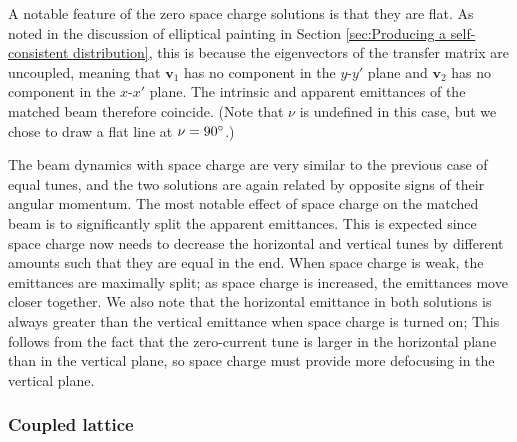 %
A notable feature of the zero space charge solutions is that they are flat. As noted in the discussion of elliptical painting in Section \ref{sec:Producing a self-consistent distribution}, this is because the eigenvectors of the transfer matrix are uncoupled, meaning that $\mathbf{v}_1$ has no component in the $y$-$y'$ plane and $\mathbf{v}_2$ has no component in the $x$-$x'$ plane. The intrinsic and apparent emittances of the matched beam therefore coincide. (Note that $\nu$ is undefined in this case, but we chose to draw a flat line at $\nu = 90\degree$.) 

The beam dynamics with space charge are very similar to the previous case of equal tunes, and the two solutions are again related by opposite signs of their angular momentum. The most notable effect of space charge on the matched beam is to significantly split the apparent emittances. This is expected since space charge now needs to decrease the horizontal and vertical tunes by different amounts such that they are equal in the end. When space charge is weak, the emittances are maximally split; as space charge is increased, the emittances move closer together. We also note that the horizontal emittance in both solutions is always greater than the vertical emittance when space charge is turned on; This follows from the fact that the zero-current tune is larger in the horizontal plane than in the vertical plane, so space charge must provide more defocusing in the vertical plane.






\subsubsection{Coupled lattice}

